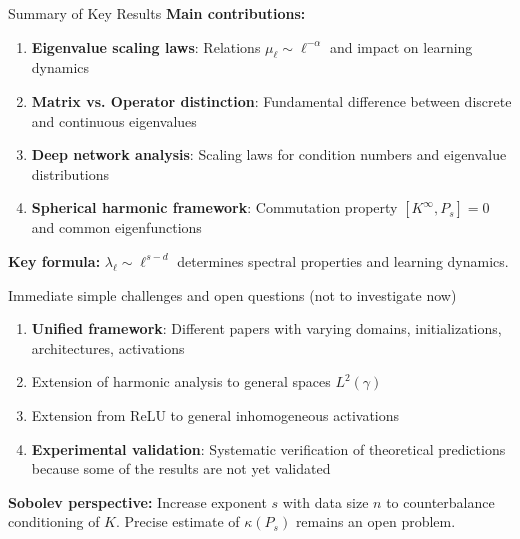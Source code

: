 \documentclass{beamer}
\begin{document}
\begin{frame}{Summary of Key Results}
\textbf{Main contributions:}

\begin{enumerate}
\item \textbf{Eigenvalue scaling laws}: Relations $\mu_\ell \sim \ell^{-\alpha}$ and impact on learning dynamics

\item \textbf{Matrix vs. Operator distinction}: Fundamental difference between discrete and continuous eigenvalues


\item \textbf{Deep network analysis}: Scaling laws for condition numbers and eigenvalue distributions

\item \textbf{Spherical harmonic framework}: Commutation property $[K^{\infty}, P_s] = 0$ and common eigenfunctions
\end{enumerate}

\textbf{Key formula:} $\lambda_\ell \sim \ell^{s-d}$ determines spectral properties and learning dynamics.
\end{frame}



\begin{frame}{Immediate simple challenges and open questions (not to investigate now)}
\begin{enumerate}
\item \textbf{Unified framework}: Different papers with varying domains, initializations, architectures, activations

\item Extension of harmonic analysis to general spaces $L^2(\gamma)$

\item  Extension from ReLU to general inhomogeneous activations

\item \textbf{Experimental validation}: Systematic verification of theoretical predictions because some of the results are not yet validated
\end{enumerate}

\textbf{Sobolev perspective:} Increase exponent $s$ with data size $n$ to counterbalance conditioning of $K$. Precise estimate of $\kappa(P_s)$ remains an open problem.
\end{frame}
\end{document}
